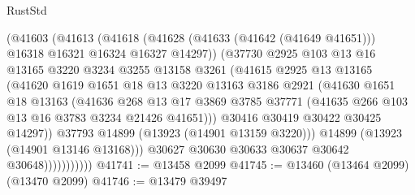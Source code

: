 \begin{lexlean}{RustStd}
\begin{coremodule}
                        (@41603
                          (@41613
                            (@41618
                              (@41628
                                (@41633 (@41642 (@41649 @41651)))
                                @16318
                                @16321
                                @16324
                                @16327
                                @14297))
                            (@37730
                              @2925
                              @103
                              @13
                              @16
                              @13165
                              @3220
                              @3234
                              @3255
                              @13158
                              @3261
                              (@41615
                                @2925
                                @13
                                @13165
                                (@41620
                                  @1619
                                  @1651
                                  @18
                                  @13
                                  @3220
                                  @13163
                                  @3186
                                  @2921
                                  (@41630
                                    @1651
                                    @18
                                    @13163
                                    (@41636
                                      @268
                                      @13
                                      @17
                                      @3869
                                      @3785
                                      @37771
                                      (@41635 @266 @103 @13 @16 @3783 @3234 @21426 @41651)))
                                  @30416
                                  @30419
                                  @30422
                                  @30425
                                  @14297))
                              @37793
                              @14899
                              (@13923 (@14901 @13159 @3220)))
                            @14899
                            (@13923 (@14901 @13146 @13168)))
                          @30627
                          @30630
                          @30633
                          @30637
                          @30642
                          @30648)))))))))))
@41741 := @13458 @2099
@41745 := @13460 (@13464 @2099) (@13470 @2099)
@41746 := @13479 @39497

\end{coremodule}
\end{lexlean}
